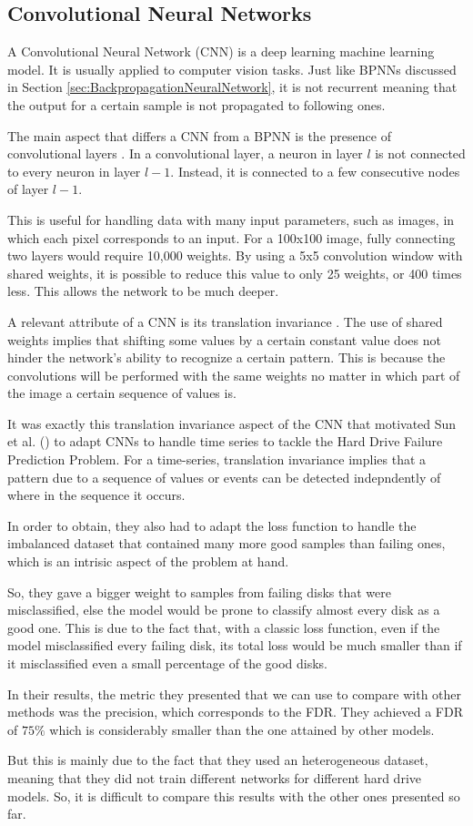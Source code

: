 \subsection{Convolutional Neural Networks}

A Convolutional Neural Network (CNN) is a deep learning machine learning model.
It is usually applied to computer vision tasks.
Just like BPNNs discussed in Section \ref{sec:BackpropagationNeuralNetwork}, it is not recurrent meaning that the output for a certain sample is not propagated to following ones.

The main aspect that differs a CNN from a BPNN is the presence of convolutional layers \cite{o2015introduction}.
In a convolutional layer, a neuron in layer $l$ is not connected to every neuron in layer $l-1$.
Instead, it is connected to a few consecutive nodes of layer $l-1$.

This is useful for handling data with many input parameters, such as images, in which each pixel corresponds to an input.
For a 100x100 image, fully connecting two layers would require 10,000 weights.
By using a 5x5 convolution window with shared weights, it is possible to reduce this value to only 25 weights, or 400 times less.
This allows the network to be much deeper.
 
A relevant attribute of a CNN is its translation invariance \cite{kayhan2020translation}.
The use of shared weights implies that shifting some values by a certain constant value does not hinder the network's ability to recognize a certain pattern.
This is because the convolutions will be performed with the same weights no matter in which part of the image a certain sequence of values is.

It was exactly this translation invariance aspect of the CNN that motivated Sun et al. (\cite{sun2019system}) to adapt CNNs to handle time series to tackle the Hard Drive Failure Prediction Problem.
For a time-series, translation invariance implies that a pattern due to a sequence of values or events can be detected indepndently of where in the sequence it occurs.

In order to obtain, they also had to adapt the loss function to handle the imbalanced dataset that contained many more good samples than failing ones, which is an intrisic aspect of the problem at hand.

So, they gave a bigger weight to samples from failing disks that were misclassified, else the model would be prone to classify almost every disk as a good one.
This is due to the fact that, with a classic loss function, even if the model misclassified every failing disk, its total loss would be much smaller than if it misclassified even a small percentage of the good disks.

In their results, the metric they presented that we can use to compare with other methods was the precision, which corresponds to the FDR.
They achieved a FDR of $75\%$ which is considerably smaller than the one attained by other models.

But this is mainly due to the fact that they used an heterogeneous dataset, meaning that they did not train different networks for different hard drive models.
So, it is difficult to compare this results with the other ones presented so far.